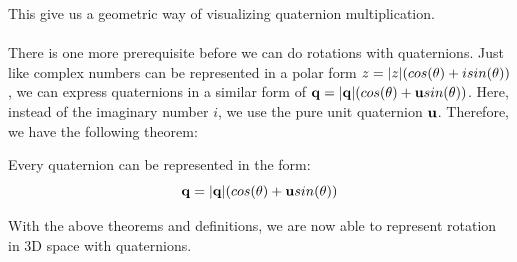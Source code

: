 This give us a geometric way of visualizing quaternion multiplication.
\\ \\
\noindent There is one more prerequisite before we can do rotations with quaternions.
Just like complex numbers can be represented in a polar form $z = \lvert z\rvert(cos(\theta) + isin(\theta))$, we can express quaternions in a similar form of $\text{\textbf{q}} = \lvert\text{\textbf{q}}\rvert(cos(\theta) + \text{\textbf{u}} sin(\theta))$.
Here, instead of the imaginary number $i$, we use the pure unit quaternion $\text{\textbf{u}}$.
Therefore, we have the following theorem:
\begin{thm}
Every quaternion can be represented in the form:
$$ \text{\textbf{q}} = \lvert\text{\textbf{q}}\rvert(cos(\theta) + \text{\textbf{u}} sin(\theta))$$
\end{thm}

With the above theorems and definitions, we are now able to represent rotation in 3D space with quaternions.

